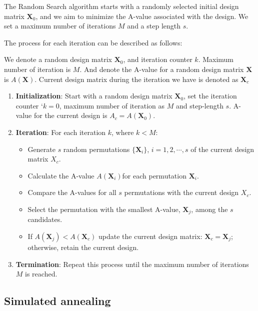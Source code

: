 \documentclass[
  a4paper,
  oneside,
  openany,
  12pt,
  onecolumn]{book}
\providecommand{\tightlist}{%
  \setlength{\itemsep}{0pt}\setlength{\parskip}{0pt}}\usepackage{longtable,booktabs,array}
\theoremstyle{definition}
\theoremstyle{definition}
\theoremstyle{plain}
\theoremstyle{remark}
\begin{document}
The Random Search algorithm starts with a randomly selected initial
design matrix \(\boldsymbol{X}_0\), and we aim to minimize the A-value
associated with the design. We set a maximum number of iterations \(M\)
and a step length \(s\).

The process for each iteration can be described as follows:

We denote a random design matrix \(\boldsymbol{X}_0\), and iteration
counter \(k\). Maximum number of iteration is \(M\). And denote the
A-value for a random design matrix \(\boldsymbol{X}\) is
\(A(\boldsymbol{X})\). Current design matrix during the iteration we
have is denoted as \(\boldsymbol{X}_c\)

\begin{enumerate}
\def\labelenumi{\arabic{enumi}.}
\item
  \textbf{Initialization}: Start with a random design matrix
  \(\boldsymbol{X}_0\), set the iteration counter `\(k = 0\), maximum
  number of iteration as \(M\) and step-length \(s\). A-value for the
  current design is \(A_c = A(\boldsymbol{X}_0)\).
\item
  \textbf{Iteration}: For each iteration \(k\), where \(k < M\):

  \begin{itemize}
  \tightlist
  \item
    Generate \(s\) random permutations \(\{\boldsymbol{X}_i\}\),
    \(i=1,2,\cdots,s\) of the current design matrix \(X_c\).
  \item
    Calculate the A-value \(A(\boldsymbol{X}_i)\)for each permutation
    \(\boldsymbol{X}_i\).
  \item
    Compare the A-values for all \(s\) permutations with the current
    design \(X_c\).
  \item
    Select the permutation with the smallest A-value,
    \(\boldsymbol{X}_j\), among the \(s\) candidates.
  \item
    If \(A(\boldsymbol{X}_j) < A(\boldsymbol{X}_c)\) update the current
    design matrix: \(\boldsymbol{X}_c = \boldsymbol{X}_j\); otherwise,
    retain the current design.
  \end{itemize}
\item
  \textbf{Termination}: Repeat this process until the maximum number of
  iterations \(M\) is reached.
\end{enumerate}

\subsection{Simulated annealing}\label{simulated-annealing}
\end{document}
